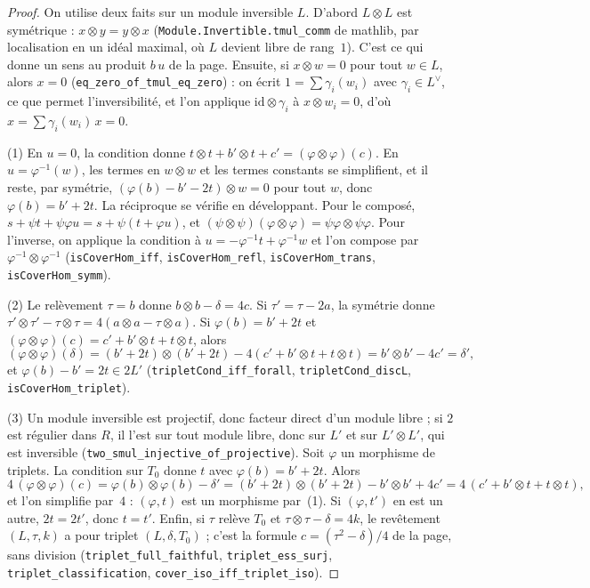 \begin{proof}
On utilise deux faits sur un module inversible $L$. D'abord $L \otimes L$ est symétrique : $x \otimes y = y \otimes x$ (\texttt{Module.\allowbreak{}Invertible.\allowbreak{}tmul\_comm} de mathlib, par localisation en un idéal maximal, où $L$ devient libre de rang~$1$). C'est ce qui donne un sens au produit $b\,u$ de la page. Ensuite, si $x \otimes w = 0$ pour tout $w \in L$, alors $x = 0$ (\texttt{eq\_zero\_of\_tmul\_eq\_zero}) : on écrit $1 = \sum \gamma_i(w_i)$ avec $\gamma_i \in L^\vee$, ce que permet l'inversibilité, et l'on applique $\mathrm{id} \otimes \gamma_i$ à $x \otimes w_i = 0$, d'où $x = \sum \gamma_i(w_i)\,x = 0$.

(1) En $u = 0$, la condition donne $t \otimes t + b' \otimes t + c' = (\varphi \otimes \varphi)(c)$. En $u = \varphi^{-1}(w)$, les termes en $w \otimes w$ et les termes constants se simplifient, et il reste, par symétrie, $(\varphi(b) - b' - 2t) \otimes w = 0$ pour tout $w$, donc $\varphi(b) = b' + 2t$. La réciproque se vérifie en développant. Pour le composé, $s + \psi t + \psi\varphi u = s + \psi(t + \varphi u)$, et $(\psi \otimes \psi)(\varphi \otimes \varphi) = \psi\varphi \otimes \psi\varphi$. Pour l'inverse, on applique la condition à $u = -\varphi^{-1}t + \varphi^{-1}w$ et l'on compose par $\varphi^{-1} \otimes \varphi^{-1}$ (\texttt{isCoverHom\_iff}, \texttt{isCoverHom\_refl}, \texttt{isCoverHom\_trans}, \texttt{isCoverHom\_symm}).

(2) Le relèvement $\tau = b$ donne $b \otimes b - \delta = 4c$. Si $\tau' = \tau - 2a$, la symétrie donne $\tau' \otimes \tau' - \tau \otimes \tau = 4(a \otimes a - \tau \otimes a)$. Si $\varphi(b) = b' + 2t$ et $(\varphi \otimes \varphi)(c) = c' + b' \otimes t + t \otimes t$, alors
\[ (\varphi \otimes \varphi)(\delta) = (b' + 2t) \otimes (b' + 2t) - 4(c' + b' \otimes t + t \otimes t) = b' \otimes b' - 4c' = \delta', \]
et $\varphi(b) - b' = 2t \in 2L'$ (\texttt{tripletCond\_iff\_forall}, \texttt{tripletCond\_discL}, \texttt{isCoverHom\_triplet}).

(3) Un module inversible est projectif, donc facteur direct d'un module libre ; si $2$ est régulier dans $R$, il l'est sur tout module libre, donc sur $L'$ et sur $L' \otimes L'$, qui est inversible (\texttt{two\_smul\_injective\_of\_projective}). Soit $\varphi$ un morphisme de triplets. La condition sur $T_0$ donne $t$ avec $\varphi(b) = b' + 2t$. Alors
\[ 4\,(\varphi \otimes \varphi)(c) = \varphi(b) \otimes \varphi(b) - \delta' = (b' + 2t) \otimes (b' + 2t) - b' \otimes b' + 4c' = 4\,(c' + b' \otimes t + t \otimes t), \]
et l'on simplifie par~$4$ : $(\varphi, t)$ est un morphisme par~(1). Si $(\varphi, t')$ en est un autre, $2t = 2t'$, donc $t = t'$. Enfin, si $\tau$ relève $T_0$ et $\tau \otimes \tau - \delta = 4k$, le revêtement $(L, \tau, k)$ a pour triplet $(L, \delta, T_0)$ ; c'est la formule $c = (\tau^2 - \delta)/4$ de la page, sans division (\texttt{triplet\_full\_faithful}, \texttt{triplet\_ess\_surj}, \texttt{triplet\_classification}, \texttt{cover\_iso\_iff\_triplet\_iso}).
\end{proof}

